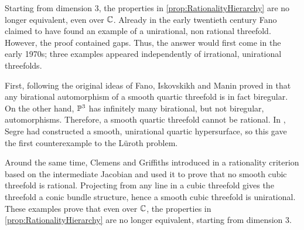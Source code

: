 Starting from dimension 3, the properties in \cref{prop:RationalityHierarchy} are no longer equivalent, even over $\C$. Already in the early twentieth century Fano claimed to have found an example of a unirational, non rational threefold. However, the proof contained gaps.
Thus, the answer would first come in the early 1970s; three examples appeared independently of irrational, unirational threefolds.

First, following the original ideas of Fano, Iskovskikh and Manin proved
in \cite{IskovskikhManin}
that any birational automorphism of a smooth quartic threefold is in fact biregular. On the other hand, $\P^3$ has infinitely many birational, but not biregular, automorphisms. Therefore, a smooth quartic threefold cannot be rational.
In \cite{SegreVariazioneContinua}, Segre had constructed a smooth, unirational quartic hypersurface, so this gave the first counterexample to the Lüroth problem.

Around the same time, Clemens and Griffiths introduced
in \cite{ClemensGriffiths}
a rationality criterion based on the intermediate Jacobian and used it to prove that no smooth cubic threefold is rational.
Projecting from any line in a cubic threefold gives the threefold a conic bundle structure, hence a smooth cubic threefold is unirational. These examples prove that even over $\C$, the properties in \cref{prop:RationalityHierarchy} are no longer equivalent,  starting from dimension 3.

